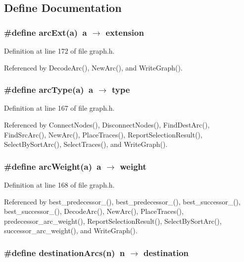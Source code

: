\subsection{Define Documentation}
\subsubsection{\setlength{\rightskip}{0pt plus 5cm}\#define arc\-Ext(a)~a $\rightarrow$ extension}\label{graph_8h_5d529b97aee5b642fcc987865050906e}




Definition at line 172 of file graph.h.

Referenced by Decode\-Arc(), New\-Arc(), and Write\-Graph().
\subsubsection{\setlength{\rightskip}{0pt plus 5cm}\#define arc\-Type(a)~a $\rightarrow$ type}\label{graph_8h_751ba2ef8956235b114b9c37c1981713}




Definition at line 167 of file graph.h.

Referenced by Connect\-Nodes(), Disconnect\-Nodes(), Find\-Dest\-Arc(), Find\-Src\-Arc(), New\-Arc(), Place\-Traces(), Report\-Selection\-Result(), Select\-By\-Sort\-Arc(), Select\-Traces(), and Write\-Graph().
\subsubsection{\setlength{\rightskip}{0pt plus 5cm}\#define arc\-Weight(a)~a $\rightarrow$ weight}\label{graph_8h_acfdde93c647be773c1ec1236aa5109f}




Definition at line 168 of file graph.h.

Referenced by best\_\-predecessor\_(), best\_\-predecessor\_(), best\_\-successor\_(), best\_\-successor\_(), Decode\-Arc(), New\-Arc(), Place\-Traces(), predecessor\_\-arc\_\-weight(), Report\-Selection\-Result(), Select\-By\-Sort\-Arc(), successor\_\-arc\_\-weight(), and Write\-Graph().
\subsubsection{\setlength{\rightskip}{0pt plus 5cm}\#define destination\-Arcs(n)~n $\rightarrow$ destination}\label{graph_8h_4258b74706ce46711b1d389f561270a3}




